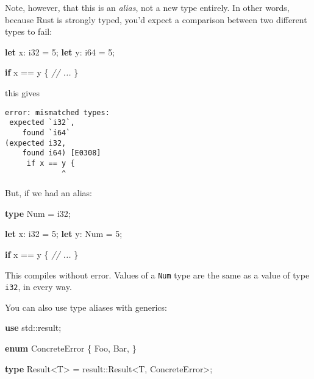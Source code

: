 \documentclass[a4paper,]{book}
\newenvironment{Shaded}{\begin{snugshade}}{\end{snugshade}}
\newcommand{\KeywordTok}[1]{\textcolor[rgb]{0.13,0.29,0.53}{\textbf{{#1}}}}
\newcommand{\DataTypeTok}[1]{\textcolor[rgb]{0.13,0.29,0.53}{{#1}}}
\newcommand{\DecValTok}[1]{\textcolor[rgb]{0.00,0.00,0.81}{{#1}}}
\newcommand{\CommentTok}[1]{\textcolor[rgb]{0.56,0.35,0.01}{\textit{{#1}}}}
\newcommand{\NormalTok}[1]{{#1}}
\begin{document}
Note, however, that this is an \emph{alias}, not a new type entirely. In
other words, because Rust is strongly typed, you'd expect a comparison
between two different types to fail:

\begin{Shaded}
\begin{Highlighting}[]
\KeywordTok{let} \NormalTok{x: }\DataTypeTok{i32} \NormalTok{= }\DecValTok{5}\NormalTok{;}
\KeywordTok{let} \NormalTok{y: }\DataTypeTok{i64} \NormalTok{= }\DecValTok{5}\NormalTok{;}

\KeywordTok{if} \NormalTok{x == y \{}
   \CommentTok{// ...}
\NormalTok{\}}
\end{Highlighting}
\end{Shaded}

this gives

\begin{verbatim}
error: mismatched types:
 expected `i32`,
    found `i64`
(expected i32,
    found i64) [E0308]
     if x == y {
             ^
\end{verbatim}

But, if we had an alias:

\begin{Shaded}
\begin{Highlighting}[]
\KeywordTok{type} \NormalTok{Num = }\DataTypeTok{i32}\NormalTok{;}

\KeywordTok{let} \NormalTok{x: }\DataTypeTok{i32} \NormalTok{= }\DecValTok{5}\NormalTok{;}
\KeywordTok{let} \NormalTok{y: Num = }\DecValTok{5}\NormalTok{;}

\KeywordTok{if} \NormalTok{x == y \{}
   \CommentTok{// ...}
\NormalTok{\}}
\end{Highlighting}
\end{Shaded}

This compiles without error. Values of a \texttt{Num} type are the same
as a value of type \texttt{i32}, in every way.

You can also use type aliases with generics:

\begin{Shaded}
\begin{Highlighting}[]
\KeywordTok{use} \NormalTok{std::result;}

\KeywordTok{enum} \NormalTok{ConcreteError \{}
    \NormalTok{Foo,}
    \NormalTok{Bar,}
\NormalTok{\}}

\KeywordTok{type} \NormalTok{Result<T> = result::}\DataTypeTok{Result}\NormalTok{<T, ConcreteError>;}
\end{Highlighting}
\end{Shaded}
\end{document}
